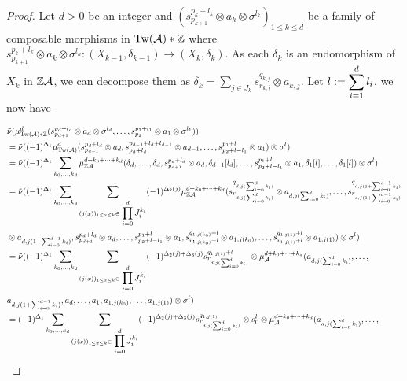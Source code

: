 \documentclass[12pt]{article}
\begin{document}
	\begin{proof}
	
	Let $d >0$ be an integer and $(s^{p_k + l_k}_{p_{k+1}} \otimes a_k \otimes \sigma^{l_k})_{1 \leq k \leq d}$ be a family of composable morphisms in $\textup{Tw}({\cal{A}}) * \mathbb{Z}$ where $s^{p_k + l_k}_{p_{k+1}} \otimes a_k \otimes \sigma^{l_k}: (X_{k-1},\delta_{k-1}) \to (X_k,\delta_k)$. As each $\delta_k$ is an endomorphism of $X_k$ in $\mathbb{Z} {\cal{A}}$, we can decompose them as $\delta_k = \displaystyle\sum_{j \in J_k} s^{q_{k,j}}_{r_{k,j}} \otimes a_{k,j}$. Let $l:= \displaystyle\sum_{i=1}^d l_i$, we now have
	
	\begin{align*}
		& \tilde{\nu}(\mu_{\Tw(\Acat) * \Z}^d(s^{p_d + l_d}_{p_{d+1}} \otimes a_d \otimes \sigma^{l_d},\dots,s^{p_1 + l_1}_{p_{2}} \otimes a_1 \otimes \sigma^{l_1})) \\
		&= \tilde{\nu}((-1)^{\Delta_1} \mu_{\Tw(\Acat)}^d(s^{p_d + l_d}_{p_{d+1}} \otimes a_d,s^{p_{d-1} + l_d + l_{d-1}}_{p_d + l_d} \otimes a_{d-1},\dots,s^{p_1 + l}_{p_2 + l - l_1} \otimes a_1) \otimes \sigma^{l}) \\
		&= \tilde{\nu}((-1)^{\Delta_1} \sum_{k_0,\dots,k_d} \mu_{\Z \Acat}^{d + k_0 + \dots + k_d}(\delta_d,\dots,\delta_d,s^{p_d + l_d}_{p_{d+1}} \otimes a_d,\delta_{d-1}[l_d],\dots,s^{p_1+l}_{p_2 + l - l_1} \otimes a_1, \delta_1[l],\dots,\delta_1[l])\otimes \sigma^l) \\
		&= \tilde{\nu}((-1)^{\Delta_1} \sum_{k_0,\dots,k_d} \sum_{(j(x))_{1 \leq x \leq k} \in \d\prod_{i=0}^d J_i^{k_i}} (-1)^{\Delta_2(j)} \mu_{\Z \Acat}^{d + k_0 + \dots + k_d}(s^{q_{d,j(\sum_{i=0}^{d} k_i)}}_{r_{d,j(\sum_{i=0}^{d} k_i)}}\otimes a_{d,j(\sum_{i=0}^{d} k_i)},\dots,s^{q_{d,j(1 +\sum_{i=0}^{d-1} k_i)}}_{r_{d,j(1+\sum_{i=0}^{d-1} k_i)}} \\
		&\otimes a_{d,j(1+\sum_{i=0}^{d-1} k_i)},s^{p_d + l_d}_{p_{d+1}} \otimes a_d,\dots,s^{p_1+l}_{p_2 + l - l_1} \otimes a_1, s^{q_{1,j(k_0)}+l}_{r_{1,j(k_0)}+l} \otimes a_{1,j(k_0)},\dots,s^{q_{1,j(1)}+l}_{r_{1,j(1)}+l}\otimes a_{1,j(1)})\otimes \sigma^l) \\
		&= \tilde{\nu}((-1)^{\Delta_1} \sum_{k_0,\dots,k_d} \sum_{(j(x))_{1 \leq x \leq k} \in \d\prod_{i=0}^d J_i^{k_i}} (-1)^{\Delta_2(j) + \Delta_3(j)} s^{q_{1,j(1)}+l}_{r_{d,j(\sum_{i=0}^{d}k_i)}} \otimes \mu_\Acat^{d + k_0 + \dots + k_d}(a_{d,j(\sum_{i=0}^{d} k_i)},\dots, \\
		&a_{d,j(1+\sum_{i=0}^{d-1} k_i)},a_d,\dots, a_1, a_{1,j(k_0)},\dots,a_{1,j(1)})\otimes \sigma^l) \\
		&= (-1)^{\Delta_1} \sum_{k_0,\dots,k_d} \sum_{(j(x))_{1 \leq x \leq k} \in \d\prod_{i=0}^d J_i^{k_i}} (-1)^{\Delta_2(j) + \Delta_3(j)} s^{q_{1,j(1)}}_{r_{d,j(\sum_{i=0}^{d}k_i)}} \otimes s^l_0 \otimes \mu_\Acat^{d + k_0 + \dots + k_d}(a_{d,j(\sum_{i=0}^{d} k_i)},\dots, \\

\end{align*}
\end{proof}
\end{document}
